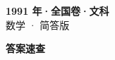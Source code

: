 \documentclass[zihao=-4, a4paper]{ctexart}
\begin{document}
\begin{center}
  {\Large\bfseries 1991 年·全国卷·文科}\\[4pt]
  {\large 数学 · 简答版}
\end{center}
\medskip
{}

\clearpage
{}
\begin{center}{\Large\bfseries 答案速查}\end{center}
\medskip

\end{document}
